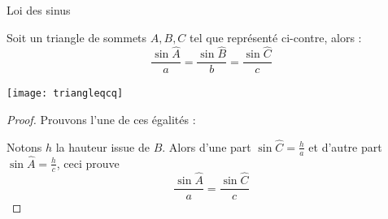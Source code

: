 \begin{frame}{Loi des sinus}
  \begin{minipage}{0.49\linewidth}
  Soit un triangle de sommets \(A,B,C\) tel que représenté ci-contre, alors :
  \begin{equation*}
    \frac{\sin \hat A}{a} = \frac{\sin\hat B}{b} = \frac{\sin\hat C}{c}
  \end{equation*}
\end{minipage}
\begin{minipage}{0.49\linewidth}
  \texttt{[image: triangleqcq]}
\end{minipage}
  \begin{proof}\pause %
    Prouvons l'une de ces égalités :

    Notons \(h\) la hauteur issue de \(B\). Alors d'une part \(\sin \hat{C} = \frac{h}{a}\) et d'autre part \(\sin \hat{A} = \frac{h}{c}\), ceci prouve
    \begin{equation*}
      \frac{\sin \hat A}{a} =  \frac{\sin\hat C}{c}
    \end{equation*}
  \end{proof}
\end{frame}

